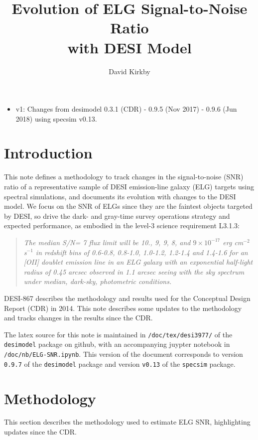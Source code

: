 \documentclass[12pt]{article}
\title{Evolution of ELG Signal-to-Noise Ratio\\
with DESI Model\\
\vspace{5mm}{\large\bf DESI-doc-3977-v1}}
\author{David Kirkby}
\begin{document}
\maketitle

\begin{itemize}
    \item v1: Changes from desimodel 0.3.1 (CDR) - 0.9.5 (Nov 2017) - 0.9.6 (Jun 2018) using specsim v0.13.
\end{itemize}

\section{Introduction}

This note defines a methodology to track changes in the signal-to-noise (SNR) ratio of a representative sample of DESI emission-line galaxy (ELG)
targets using spectral simulations, and documents its evolution with changes to the DESI model.  We focus on the SNR of ELGs
since they are the faintest objects targeted by DESI, so drive the dark- and gray-time survey operations strategy and expected performance,
as embodied in the level-3 science requirement L3.1.3:
\begin{quote}
\it The median S/N= 7 flux limit will be 10., 9, 9, 8, and $9\times 10^{−17}$ erg cm$^{-2}$ s$^{-1}$
in redshift bins of 0.6-0.8, 0.8-1.0, 1.0-1.2, 1.2-1.4 and
1.4-1.6 for an [OII] doublet emission line in an ELG galaxy with
an exponential half-light radius of 0.45 arcsec observed in 1.1 arcsec
seeing with the sky spectrum under median, dark-sky, photometric
conditions.
\end{quote}
DESI-867\cite{desi-867} describes the methodology and results used for the Conceptual Design Report (CDR) in 2014.
This note describes some updates to the methodology and tracks changes in the results since the CDR.

The latex source for this note is maintained in {\tt /doc/tex/desi3977/} of the {\tt desimodel} package on github,
with an accompanying juypter notebook in {\tt /doc/nb/ELG-SNR.ipynb}. This version of the document corresponds to
version {\tt 0.9.7} of the {\tt desimodel} package and version {\tt v0.13} of the {\tt specsim} package.

\section{Methodology}

This section describes the methodology used to estimate ELG SNR, highlighting updates since the CDR.
\end{document}

